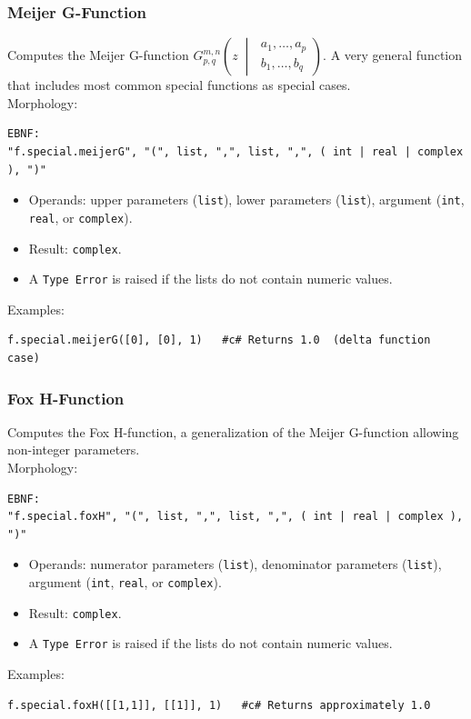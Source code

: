 \subsubsection{Meijer G-Function}
Computes the Meijer G-function $G_{p,q}^{m,n}\!\left(z \;\middle|\; \begin{smallmatrix} a_1, \ldots, a_p \\ b_1, \ldots, b_q \end{smallmatrix}\right)$. A very general function that includes most common special functions as special cases. \\
Morphology:
\begin{verbatim}
EBNF:
"f.special.meijerG", "(", list, ",", list, ",", ( int | real | complex ), ")"
\end{verbatim}
\begin{itemize}
\item Operands: upper parameters (\texttt{list}), lower parameters (\texttt{list}), argument (\texttt{int}, \texttt{real}, or \texttt{complex}).
\item Result: \texttt{complex}.
\item A \texttt{Type Error} is raised if the lists do not contain numeric values.
\end{itemize}
Examples:
\begin{verbatim}
f.special.meijerG([0], [0], 1)   #c# Returns 1.0  (delta function case)
\end{verbatim}

\subsubsection{Fox H-Function}
Computes the Fox H-function, a generalization of the Meijer G-function allowing non-integer parameters. \\
Morphology:
\begin{verbatim}
EBNF:
"f.special.foxH", "(", list, ",", list, ",", ( int | real | complex ), ")"
\end{verbatim}
\begin{itemize}
\item Operands: numerator parameters (\texttt{list}), denominator parameters (\texttt{list}), argument (\texttt{int}, \texttt{real}, or \texttt{complex}).
\item Result: \texttt{complex}.
\item A \texttt{Type Error} is raised if the lists do not contain numeric values.
\end{itemize}
Examples:
\begin{verbatim}
f.special.foxH([[1,1]], [[1]], 1)   #c# Returns approximately 1.0
\end{verbatim}

